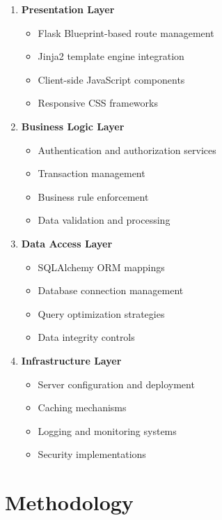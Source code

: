 \documentclass{article}
\begin{document}
\begin{enumerate}
    \item \textbf{Presentation Layer}
    \begin{itemize}
        \item Flask Blueprint-based route management
        \item Jinja2 template engine integration
        \item Client-side JavaScript components
        \item Responsive CSS frameworks
    \end{itemize}

    \item \textbf{Business Logic Layer}
    \begin{itemize}
        \item Authentication and authorization services
        \item Transaction management
        \item Business rule enforcement
        \item Data validation and processing
    \end{itemize}

    \item \textbf{Data Access Layer}
    \begin{itemize}
        \item SQLAlchemy ORM mappings
        \item Database connection management
        \item Query optimization strategies
        \item Data integrity controls
    \end{itemize}

    \item \textbf{Infrastructure Layer}
    \begin{itemize}
        \item Server configuration and deployment
        \item Caching mechanisms
        \item Logging and monitoring systems
        \item Security implementations
    \end{itemize}
\end{enumerate}

\section{Methodology}
\end{document}
